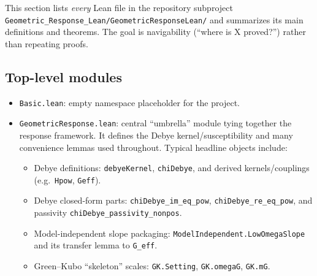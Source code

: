 \documentclass[11pt]{article}
\begin{document}
This section lists \emph{every} Lean file in the repository subproject
\texttt{Geometric\_Response\_Lean/GeometricResponseLean/} and summarizes its main definitions and theorems.
The goal is navigability (``where is X proved?'') rather than repeating proofs.

\subsection{Top-level modules}
\begin{itemize}
\item \texttt{Basic.lean}: empty namespace placeholder for the project.

\item \texttt{GeometricResponse.lean}: central ``umbrella'' module tying together the response framework. It defines the Debye kernel/susceptibility and many convenience lemmas used throughout.
Typical headline objects include:
\begin{itemize}
\item Debye definitions: \texttt{debyeKernel}, \texttt{chiDebye}, and derived kernels/couplings (e.g.\ \texttt{Hpow}, \texttt{Geff}).
\item Debye closed-form parts: \texttt{chiDebye\_im\_eq\_pow}, \texttt{chiDebye\_re\_eq\_pow}, and passivity \texttt{chiDebye\_passivity\_nonpos}.
\item Model-independent slope packaging: \texttt{ModelIndependent.LowOmegaSlope} and its transfer lemma to \texttt{G\_eff}.
\item Green--Kubo ``skeleton'' scales: \texttt{GK.Setting}, \texttt{GK.omegaG}, \texttt{GK.mG}.
\end{itemize}
\end{itemize}
\end{document}
